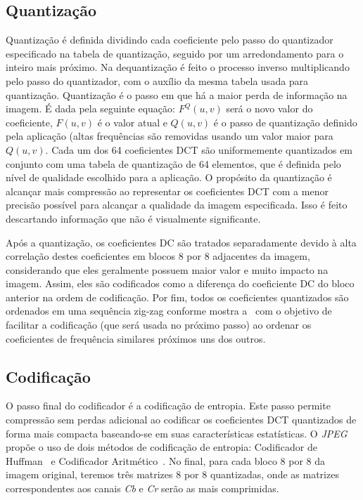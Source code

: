 \subsection{Quantização}
Quantização é definida dividindo cada coeficiente pelo passo do quantizador especificado na tabela de quantização, seguido por um arredondamento para o inteiro mais próximo. Na dequantização é feito o processo inverso multiplicando pelo passo do quantizador, com o auxílio da mesma tabela usada para quantização. Quantização é o passo em que há a maior perda de informação na imagem. É dada pela seguinte equação:
$F^Q(u,v)$ será o novo valor do coeficiente, $F(u,v)$  é o valor atual e $Q(u,v)$ é o passo de quantização definido pela aplicação (altas frequências são removidas usando um valor maior para $Q(u,v)$. Cada um dos 64 coeficientes \acrshort{DCT} são uniformemente quantizados em conjunto com uma tabela de quantização de 64 elementos, que é definida pelo nível de qualidade escolhido para a aplicação. O propósito da quantização é alcançar mais compressão ao representar os coeficientes \acrshort{DCT} com a menor precisão possível para alcançar a qualidade da imagem especificada. Isso é feito descartando informação que não é visualmente significante.

Após a quantização, os coeficientes \acrshort{DC} são tratados separadamente devido à alta correlação destes coeficientes em blocos 8 por 8 adjacentes da imagem, considerando que eles geralmente possuem maior valor e muito impacto na imagem. Assim, eles são codificados como a diferença do coeficiente DC do bloco anterior na ordem de codificação. Por fim, todos os coeficientes quantizados são ordenados em uma sequência zig-zag conforme mostra a~ com o objetivo de facilitar a codificação (que será usada no próximo passo) ao ordenar os coeficientes de frequência similares próximos uns dos outros.
\subsection{Codificação}
O passo final do codificador é a codificação de entropia. Este passo permite compressão sem perdas adicional ao codificar os coeficientes \acrshort{DCT} quantizados de forma mais compacta baseando-se em suas características estatísticas. O \textit{JPEG} propõe o uso de dois métodos de codificação de entropia: Codificador de Huffman~\cite{huffman1952method} e Codificador Aritmético~\cite{pennebaker1988arithmetic}. No final, para cada bloco 8 por 8 da imagem original, teremos três matrizes 8 por 8 quantizadas, onde as matrizes correspondentes aos canais \textit{Cb} e \textit{Cr} serão as mais comprimidas.

